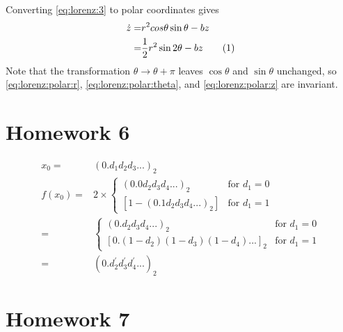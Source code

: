 \documentclass[]{article}
\newcommand\numberthis{\addtocounter{equation}{1}\tag{\theequation}}
\begin{document}
Converting \eqref{eq:lorenz:3} to polar coordinates gives
\begin{align*}
	\dot{z} =& r^2 cos\theta \sin\theta - b z\\
	=& \frac{1}{2} r^2 \sin 2\theta -bz \numberthis \label{eq:lorenz:polar:z}
\end{align*}
Note that the transformation $\theta \rightarrow \theta + \pi$ leaves $\cos \theta$ and $\sin \theta$ unchanged, so \eqref{eq:lorenz:polar:r}, \eqref{eq:lorenz:polar:theta}, and \eqref{eq:lorenz:polar:z} are invariant.

\section{Homework 6}

\begin{align*}
	x_0 =& (0.d_1 d_2 d_3 ...)_2\\
	f(x_0) =& 2 \times \begin{cases}
		(0.0 d_2 d_3 d_4...)_2 & \text{for } d_1 = 0\\
		[1- (0.1 d_2 d_3 d_4...)_2] & \text{for } d_1 = 1
	\end{cases}\\
		=& \begin{cases}
			(0.d_2 d_3 d_4...)_2 & \text{for } d_1 = 0\\
			[0.(1-d_2) (1-d_3) (1-d_4)...]_2 & \text{for } d_1 = 1
		\end{cases}\\
	=& (0.d^\prime_2 d^\prime_3 d^\prime_4 ...)_2
\end{align*}
\section{Homework 7}
\end{document}
